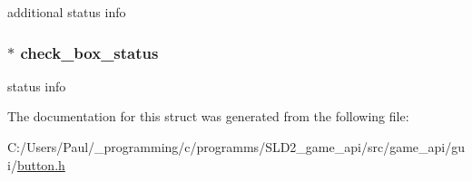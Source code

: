 additional status info \hypertarget{struct__check__box_ad26008f10118371ca26980a69e0c380b}{
\subsubsection[{check\+\_\+box\+\_\+status}]{$\ast$ check\+\_\+box\+\_\+status}}\label{struct__check__box_ad26008f10118371ca26980a69e0c380b}
status info 

The documentation for this struct was generated from the following file\+:\begin{DoxyCompactItemize}
\item 
C\+:/\+Users/\+Paul/\+\_\+programming/c/programms/\+S\+L\+D2\+\_\+game\+\_\+api/src/game\+\_\+api/gui/\hyperlink{button_8h}{button.\+h}\end{DoxyCompactItemize}
